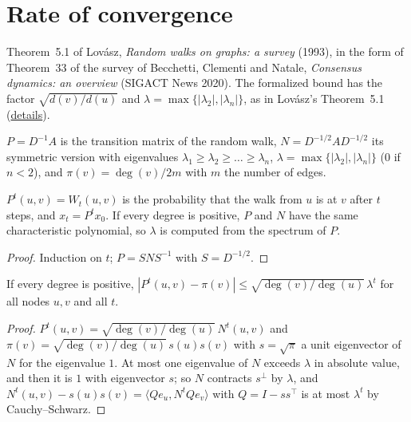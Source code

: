 \section{Rate of convergence}\label{sec:lovasz}
Theorem~5.1 of Lovász, \emph{Random walks on graphs: a survey} (1993), in the form of
Theorem~33 of the survey of Becchetti, Clementi and Natale, \emph{Consensus dynamics: an
overview} (SIGACT News 2020). The formalized bound has the factor $\sqrt{d(v)/d(u)}$ and
$\lambda=\max\{|\lambda_2|,|\lambda_n|\}$, as in Lovász's Theorem~5.1
(\href{https://github.com/formal-dynamics/leanamics/blob/main/averaging/FORMALIZATION_DIFFERENCES.md#rate-bound-and-sequential-averaging-rate-sequential-avg-1}{details}).
\begin{definition}\label{def:walk}
\leanok{}
$P=D^{-1}A$ is the transition matrix of the random walk, $N=D^{-1/2}AD^{-1/2}$ its symmetric
version with eigenvalues $\lambda_1\ge\lambda_2\ge\dots\ge\lambda_n$,
$\lambda=\max\{|\lambda_2|,|\lambda_n|\}$ ($0$ if $n<2$), and $\pi(v)=\deg(v)/2m$ with $m$ the
number of edges.
\end{definition}
\begin{lemma}\label{lem:walk-bridges}
\leanok{}
$P^t(u,v)=W_t(u,v)$ is the probability that the walk from $u$ is at $v$ after $t$ steps, and
$x_t=P^tx_0$. If every degree is positive, $P$ and $N$ have the same characteristic polynomial,
so $\lambda$ is computed from the spectrum of $P$.
\end{lemma}
\begin{proof}\leanok
Induction on $t$; $P=SNS^{-1}$ with $S=D^{-1/2}$.
\end{proof}
\begin{theorem}\label{thm:lovasz}
\leanok{}
If every degree is positive, $|P^t(u,v)-\pi(v)|\le\sqrt{\deg(v)/\deg(u)}\,\lambda^t$ for all
nodes $u,v$ and all $t$.
\end{theorem}
\begin{proof}\leanok
$P^t(u,v)=\sqrt{\deg(v)/\deg(u)}\,N^t(u,v)$ and $\pi(v)=\sqrt{\deg(v)/\deg(u)}\,s(u)s(v)$ with
$s=\sqrt\pi$ a unit eigenvector of $N$ for the eigenvalue $1$. At most one eigenvalue of $N$
exceeds $\lambda$ in absolute value, and then it is $1$ with eigenvector $s$; so $N$ contracts
$s^\perp$ by $\lambda$, and $N^t(u,v)-s(u)s(v)=\langle Qe_u,N^tQe_v\rangle$ with $Q=I-ss^\top$
is at most $\lambda^t$ by Cauchy--Schwarz.
\end{proof}
